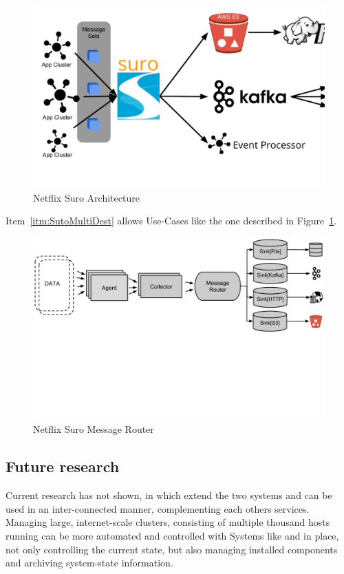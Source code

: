 \begin{figure}
  \centering
  \includegraphics[width=\linewidth,clip=true,trim=5mm 2cm 0 5mm]{images/NetflixSuro}
  \caption{Netflix Suro Architecture~\cite{Bae2013, Harris2013}}
  \label{fig:SuroArchitecture}
\end{figure}
Item~\ref{itm:SutoMultiDest} allows Use-Cases like the one described in Figure~\ref{fig:SuroArchitecture}. 


\begin{figure}
  \centering
  \includegraphics[width=\linewidth,clip=true,trim=0 75mm 0 0]{images/SuroMessageRouter}
  \caption{Netflix Suro Message Router~\cite{Bae2013}}
  \label{fig:SuroMessageRouter}
\end{figure}


\subsection{Future research}
Current research has not shown, in which extend the two systems \amblong and \chuk can be used in an inter-connected manner, complementing each others services. 
Managing large, internet-scale clusters, consisting of multiple thousand hosts running \hadooplong can be more automated and controlled with Systems like \amb and \chuk in place, not only controlling the current state, but also managing installed components and archiving system-state information.

